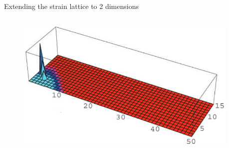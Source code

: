 \documentclass{beamer}
\begin{document}
\begin{frame}{Extending the strain lattice to 2 dimensions}
    \begin{columns}
        \begin{column}{0.5\textwidth}
            \begin{figure}
                \includegraphics[width=\textwidth]{gog_2d_fig/gog_2d_a_1.png}
            \end{figure}        
        \end{column}
        \begin{column}{0.5\textwidth}
        \end{column}
    \end{columns}
    \centering
    \vfill
    \tiny{\cite{gogDynamicsSelectionManystrain2002}}

\end{frame}
\end{document}
